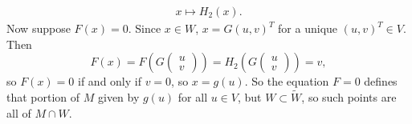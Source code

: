 \documentclass[12pt]{article}
\begin{document}
\begin{theorem}
\begin{align*}
		x \mapsto H_2(x).
	\end{align*}
	Now suppose $F(x)=0$. Since $x\in W$, $x=G(u,v)^T$ for a unique $(u,v)^T\in V$. Then 
	\begin{equation*}
		F(x) = F(G\begin{pmatrix}u\\ v\end{pmatrix}) = H_2(G\begin{pmatrix}u\\ v\end{pmatrix}) = v,
	\end{equation*}
	so $F(x)=0$ if and only if $v=0$, so $x=g(u)$. So the equation $F=0$ defines that portion of $M$ given by $g(u)$ for all $u\in V$, but $W\subset\tilde{W}$, so such points are all of $M\cap W$.
\end{theorem}
\end{document}
